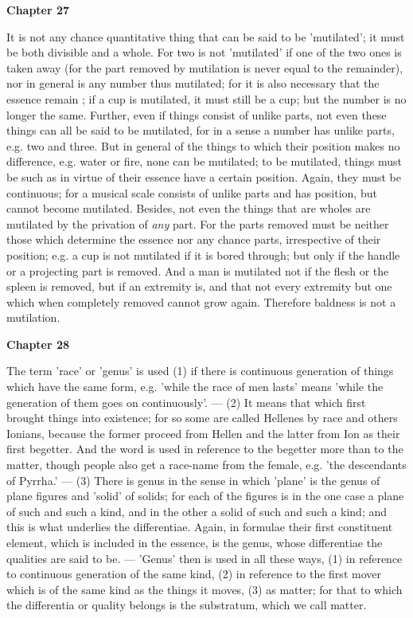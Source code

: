 \textbf{Chapter 27}

It is not any chance quantitative thing that can be said to be 'mutilated'; it must be both divisible and a whole. For two is not 'mutilated' if one of the two ones is taken away (for the part removed by mutilation is never equal to the remainder), nor in general is any number thus mutilated; for it is also necessary that the essence remain ; if a cup is mutilated, it must still be a cup; but the number is no longer the same. Further, even if things consist of unlike parts, not even these things can all be said to be mutilated, for in a sense a number has unlike parts, e.g. two and three. But in general of the things to which their position makes no difference, e.g. water or fire, none can be mutilated; to be mutilated, things must be such as in virtue of their essence have a certain position. Again, they must be continuous; for a musical scale consists of unlike parts and has position, but cannot become mutilated. Besides, not even the things that are wholes are mutilated by the privation of \emph{any} part. For the parts removed must be neither those which determine the essence nor any chance parts, irrespective of their position; e.g. a cup is not mutilated if it is bored through; but only if the handle or a projecting part is removed. And a man is mutilated not if the flesh or the spleen is removed, but if an extremity is, and that not every extremity but one which when completely removed cannot grow again. Therefore baldness is not a mutilation.

\textbf{Chapter 28}

The term 'race' or 'genus' is used (1) if there is continuous generation of things which have the same form, e.g. 'while the race of men lasts' means 'while the generation of them goes on continuously'. — (2) It means that which first brought things into existence; for so some are called Hellenes by race and others Ionians, because the former proceed from Hellen and the latter from Ion as their first begetter. And the word is used in reference to the begetter more than to the matter, though people also get a race-name from the female, e.g. 'the descendants of Pyrrha.' — (3) There is genus in the sense in which 'plane' is the genus of plane figures and 'solid' of solids; for each of the figures is in the one case a plane of such and such a kind, and in the other a solid of such and such a kind; and this is what underlies the differentiae. Again, in formulae their first constituent element, which is included in the essence, is the genus, whose differentiae the qualities are said to be. — 'Genus' then is used in all these ways, (1) in reference to continuous generation of the same kind, (2) in reference to the first mover which is of the same kind as the things it moves, (3) as matter; for that to which the differentia or quality belongs is the substratum, which we call matter.

